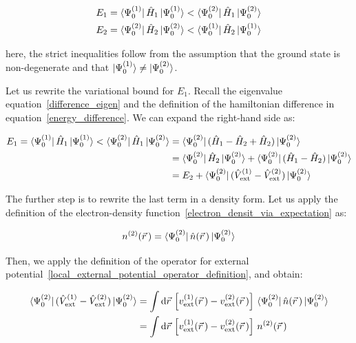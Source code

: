\begin{equation}
\begin{aligned}
    E_1&=\bra{\Psi_0^{(1)}}\hat{H}_1\ket{\Psi_0^{(1)}}<\bra{\Psi_0^{(2)}}\hat{H}_1\ket{\Psi_0^{(2)}}\\
    E_2&=\bra{\Psi_0^{(2)}}\hat{H}_2\ket{\Psi_0^{(2)}}<\bra{\Psi_0^{(1)}}\hat{H}_2\ket{\Psi_0^{(1)}}
\end{aligned}
\label{Rayleigh-Ritz_principle_application}
\end{equation}

here, the strict inequalities follow from the assumption that the ground state is non-degenerate and that $\ket{\Psi_0^{(1)}}\neq\ket{\Psi_0^{(2)}}$.

Let us rewrite the variational bound for $E_1$.
Recall the eigenvalue equation~\eqref{difference_eigen} and the definition of the hamiltonian difference in equation~\eqref{energy_difference}.
We can  expand the right-hand side as:

\begin{equation}
\begin{aligned}
    E_1=\bra{\Psi_0^{(1)}}\hat{H}_1\ket{\Psi_0^{(1)}}<\bra{\Psi_0^{(2)}}\hat{H}_1\ket{\Psi_0^{(2)}}
    &=\bra{\Psi_0^{(2)}}(\hat{H}_1-\hat{H}_2+\hat{H}_2)\ket{\Psi_0^{(2)}} \\
    &=\bra{\Psi_0^{(2)}}\hat{H}_2\ket{\Psi_0^{(2)}}
      +\bra{\Psi_0^{(2)}}(\hat{H}_1-\hat{H}_2)\ket{\Psi_0^{(2)}} \\
    &=E_2+\bra{\Psi_0^{(2)}}(\hat{V}_\mathrm{ext}^{(1)}-\hat{V}_\mathrm{ext}^{(2)})\ket{\Psi_0^{(2)}}
\end{aligned}
\label{H1_expectation_expansion}
\end{equation}

The further step is to rewrite the last term in a density form.
Let us apply the definition of the electron-density function~\eqref{electron_densit_via_expectation} as:

\begin{equation}
    n^{(2)}(\vec{r}\,) = \bra{\Psi_0^{(2)}}\hat{n}(\vec{r}\,)\ket{\Psi_0^{(2)}}
\label{density_expectation_definition}
\end{equation}

Then, we apply the definition of the operator for external potential~\eqref{local_external_potential_operator_definition}, and obtain:

\begin{equation}
\begin{aligned}
    \bra{\Psi_0^{(2)}}(\hat{V}_\mathrm{ext}^{(1)}-\hat{V}_\mathrm{ext}^{(2)})\ket{\Psi_0^{(2)}}
    &=\int \mathrm{d}\vec{r}\,\left[v_\mathrm{ext}^{(1)}(\vec{r}\,)-v_\mathrm{ext}^{(2)}(\vec{r}\,)\right]\,\bra{\Psi_0^{(2)}}\hat{n}(\vec{r}\,)\ket{\Psi_0^{(2)}} \\
    &=\int \mathrm{d}\vec{r}\,\left[v_\mathrm{ext}^{(1)}(\vec{r}\,)-v_\mathrm{ext}^{(2)}(\vec{r}\,)\right]\,n^{(2)}(\vec{r}\,)
\end{aligned}
\label{density_form_vext_difference}
\end{equation}

